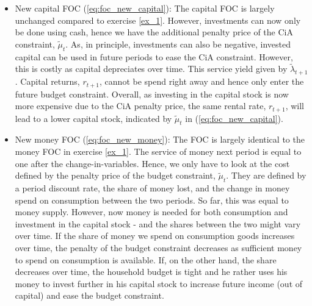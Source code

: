 \documentclass[a4paper, 12pt]{article}
\begin{document}
\begin{Answer}
\begin{small}
\begin{enumerate}
			\begin{itemize}%
				\item[$\blacktriangleright$] New capital FOC (\ref{eq:foc_new_capital}): The capital FOC is largely unchanged compared to exercise \ref{ex_1}. However, investments can now only be done using cash, hence we have the additional penalty price of the CiA constraint, $\tilde{\mu}_t$. As, in principle, investments can also be negative, invested capital can be used in future periods to ease the CiA constraint. However, this is costly as capital depreciates over time. This service yield given by $\tilde{\lambda}_{t+1}$. Capital returns, $r_{t+1}$, cannot be spend right away and hence only enter the future budget constraint. Overall, as investing in the capital stock is now more expensive due to the CiA penalty price, the same rental rate, $r_{t+1}$, will lead to a lower capital stock, indicated by $\tilde{\mu}_t$ in (\ref{eq:foc_new_capital}).%
				\item[$\blacktriangleright$] New money FOC (\ref{eq:foc_new_money}): The FOC is largely identical to the money FOC in exercise \ref{ex_1}. The service of money next period is equal to one after the change-in-variables. Hence, we only have to look at the cost defined by the penalty price of the budget constraint, $\tilde{\mu}_t$. They are defined by a period discount rate, the share of money lost, and the change in money spend on consumption between the two periods. So far, this was equal to money supply. However, now money is needed for both consumption and investment in the capital stock - and the shares between the two might vary over time. If the share of money we spend on consumption goods increases over time, the penalty of the budget constraint decreases as sufficient money to spend on consumption is available. If, on the other hand, the share decreases over time, the household budget is tight and he rather uses his money to invest further in his capital stock to increase future income (out of capital) and ease the budget constraint.%
			\end{itemize}%
		\end{enumerate}%
	\end{small}%
\end{Answer}%
\bigskip%
\end{document}
